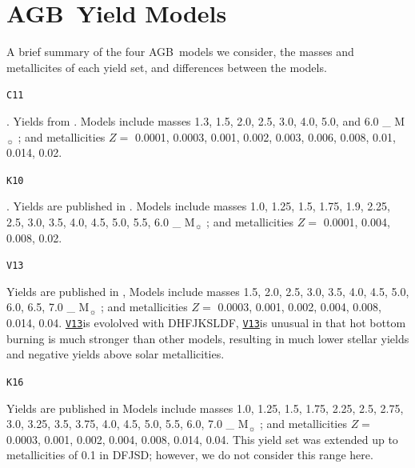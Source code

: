 \documentclass[fleqn,usenatbib]{mnras}
\newcommand{\vxiii}{\texttt{\hyperlink{V13}{V13}}}
\newcommand{\agb}{AGB}
\newcommand{\Mo}{%
    \ifmmode {\rm M}_{\sun}%
    \else M$_{\sun}$
    \fi}
\begin{document}
\section{\agb\ Yield Models} \label{sec:oob_models}
A brief summary of the four \agb\ models we consider, the masses and metallicites of each yield set, and differences between the models.

\hypertarget{C11}{\texttt{C11}}. 
Yields from \citet{cristallo+11,cristallo+15}. 
Models include masses 1.3, 1.5, 2.0, 2.5, 3.0, 4.0, 5.0, and 6.0 \Mo; and 
metallicities $Z = $ 0.0001, 0.0003, 0.001, 0.002, 0.003, 0.006, 0.008, 0.01, 0.014, 0.02. 

\hypertarget{K10}{\texttt{K10}}.
Yields are published in \citet{karakas10}. 
Models include masses  1.0, 1.25, 1.5, 1.75, 1.9, 2.25, 2.5, 3.0, 3.5, 4.0, 4.5, 5.0, 5.5, 6.0 \Mo;
and metallicities $Z=$ 0.0001, 0.004, 0.008, 0.02. 

\hypertarget{V13}{\texttt{V13}} 
Yields are published in \citet{ventura+13,ventura+14,ventura+18,vincenzo+21}, 
Models include masses 1.5, 2.0, 2.5, 3.0, 3.5, 4.0, 4.5, 5.0, 6.0, 6.5, 7.0 \Mo; 
and metallicities $Z=$ 0.0003, 0.001, 0.002, 0.004, 0.008, 0.014, 0.04.
\vxiii is evololved with DHFJKSLDF,
\vxiii is unusual in that hot bottom burning is much stronger than other models, resulting in much lower stellar yields and negative yields above solar metallicities.


\hypertarget{K16}{\texttt{K16}} 
Yields are published in \citet{KL16,karakas+18}
Models include masses 1.0, 1.25, 1.5, 1.75, 2.25, 2.5, 2.75, 3.0, 3.25, 3.5, 3.75, 4.0, 4.5, 5.0, 5.5, 6.0, 7.0 \Mo; 
and metallicities $Z=$ 0.0003, 0.001, 0.002, 0.004, 0.008, 0.014, 0.04.
This yield set was extended up to metallicities of 0.1 in DFJSD; however, we do not consider this range here.


\bsp	%
\label{lastpage}
\end{document}
